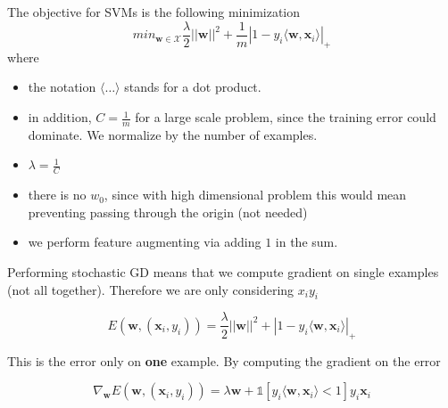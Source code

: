 The objective for SVMs is the following minimization
\[
	min_{\pmb{w} \in \mathcal{X}}\frac{\lambda}{2}||\pmb{w}||^{2}+ \frac{1}{m}|1 -
	y_{i}\langle \pmb{w}, \pmb{x}_{i}\rangle|_{+}
\]
where
\begin{itemize}
	\item the notation $\langle \dots \rangle$ stands for a dot product.

	\item in addition, $C = \frac{1}{m}$ for a large scale problem, since the training
		error could dominate. We normalize by the number of examples.

	\item $\lambda = \frac{1}{C}$

	\item there is no $w_{0}$, since with high dimensional problem this would mean
		preventing passing through the origin (not needed)

	\item we perform feature augmenting via adding $1$ in the sum.
\end{itemize}
Performing stochastic GD means that we compute gradient on single examples (not all
together). Therefore we are only considering $x_{i}y_{i}$

\[
	E(\pmb{w}, (\pmb{x}_{i}, y_{i})) = \frac{\lambda}{2}||\pmb{w}||^{2}+ |1 - y_{i}
	\langle \pmb{w}, \pmb{x}_{i}\rangle|_{+}
\]

This is the error only on \textbf{one} example. By computing the gradient on the
error

\[
	\nabla_{\pmb{w}}E(\pmb{w}, (\pmb{x}_{i}, y_{i})) = \lambda \pmb{w}+ \mathbb{1}[
	y_{i}\langle \pmb{w}, \pmb{x}_{i}\rangle < 1] y_{i}\pmb{x}_{i}
\]

